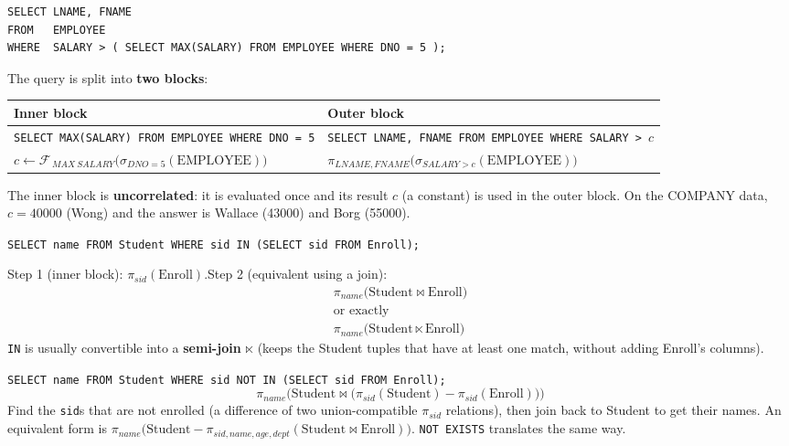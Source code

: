 \documentclass[10pt,a4paper]{article}
\newcommand{\R}[1]{\mathrm{#1}}          %
\newcommand{\agg}{\mathcal{F}}            %
\begin{document}
\begin{exbox}
\begin{verbatim}
SELECT LNAME, FNAME
FROM   EMPLOYEE
WHERE  SALARY > ( SELECT MAX(SALARY) FROM EMPLOYEE WHERE DNO = 5 );
\end{verbatim}
The query is split into \textbf{two blocks}:

\begin{tabularx}{\linewidth}{@{}X X@{}}
\toprule
\textbf{Inner block} & \textbf{Outer block}\\\midrule
\texttt{SELECT MAX(SALARY) FROM EMPLOYEE WHERE DNO = 5} & \texttt{SELECT LNAME, FNAME FROM EMPLOYEE WHERE SALARY > }$c$\\[2pt]
$c \leftarrow \agg_{\,MAX\ SALARY}\big(\sigma_{DNO=5}(\R{EMPLOYEE})\big)$ & $\pi_{LNAME,FNAME}\big(\sigma_{SALARY>c}(\R{EMPLOYEE})\big)$\\
\bottomrule
\end{tabularx}
The inner block is \textbf{uncorrelated}: it is evaluated once and its result $c$ (a constant) is used in the outer block. On the COMPANY data, $c = 40000$ (Wong) and the answer is Wallace (43000) and Borg (55000).
\end{exbox}

\begin{exbox}
\texttt{SELECT name FROM Student WHERE sid IN (SELECT sid FROM Enroll);}

Step 1 (inner block): $\pi_{sid}(\R{Enroll})$.\qquad Step 2 (equivalent using a join):
\begin{gather*}
\pi_{name}\big(\R{Student} \bowtie \R{Enroll}\big) \\
\text{or exactly} \\
\pi_{name}\big(\R{Student} \ltimes \R{Enroll}\big)
\end{gather*}
\texttt{IN} is usually convertible into a \textbf{semi-join} $\ltimes$ (keeps the Student tuples that have at least one match, without adding Enroll's columns).
\end{exbox}

\begin{exbox}
\texttt{SELECT name FROM Student WHERE sid NOT IN (SELECT sid FROM Enroll);}
\[ \pi_{name}\Big(\R{Student} \bowtie \big(\pi_{sid}(\R{Student}) - \pi_{sid}(\R{Enroll})\big)\Big) \]
Find the \texttt{sid}s that are not enrolled (a difference of two union-compatible $\pi_{sid}$ relations), then join back to Student to get their names. An equivalent form is $\pi_{name}\big(\R{Student} - \pi_{sid,name,age,dept}(\R{Student} \bowtie \R{Enroll})\big)$. \texttt{NOT EXISTS} translates the same way.
\end{exbox}
\end{document}
